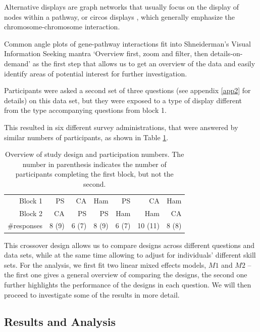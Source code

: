 Alternative displays are graph networks that usually focus on the display of nodes within a pathway, or circos displays \cite{k}, which generally emphasize the chromosome-chromosome interaction.


 Common angle plots of gene-pathway interactions fit into Shneiderman's  Visual Information Seeking mantra `Overview first, zoom and filter, then details-on-demand' \cite{shneiderman:96} as the first step that allows us to get an overview of the data and easily identify areas of potential interest for further investigation. 
  
 
 

 
Participants were asked a second set of three questions (see appendix \ref{app2} for details) on this data set, but they were exposed to a  type of display different from the type accompanying questions from block 1.
  
This resulted in six different survey administrations, that were answered by similar numbers of participants, as shown in Table \ref{tab:designs}. 

\begin{table}[htbp]
\centering
\begin{tabular}{rrrrrrr}
Block 1 & PS & CA & Ham & PS & CA & Ham \\ 
 Block 2 & CA & PS & PS & Ham & Ham & CA \\ \hline
\#responses &  8 (9) &  6 (7) &  8 (9) &  6 (7) & 10 (11) & 8 (8)\\ 
\end{tabular}
\caption{\label{tab:designs} Overview of study design and participation numbers. The number in parenthesis indicates the number of participants completing the first block, but not the second.}
\end{table}

This crossover design allows us to compare designs across different questions and data sets, while at the same time allowing to adjust for individuals' different skill sets. 
For the analysis, we first fit two linear mixed effects models, $M1$ and $M2$ -- the first one gives a general overview of comparing the designs, the second one further highlights the performance of the designs in each question.
We will then proceed to investigate some of the results in more detail.





\subsection{Results and Analysis}\label{results}
